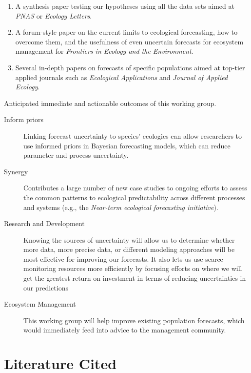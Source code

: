 \documentclass[12pt,]{article}
\providecommand{\tightlist}{%
  \setlength{\itemsep}{0pt}\setlength{\parskip}{0pt}}
\begin{document}
\begin{enumerate}
\def\labelenumi{\arabic{enumi}.}
\tightlist
\item
  A synthesis paper testing our hypotheses using all the data sets aimed
  at \emph{PNAS} or \emph{Ecology Letters}.
\item
  A forum-style paper on the current limits to ecological forecasting,
  how to overcome them, and the usefulness of even uncertain forecasts
  for ecosystem management for \emph{Frontiers in Ecology and the
  Environment}.
\item
  Several in-depth papers on forecasts of specific populations aimed at
  top-tier applied journals such as \emph{Ecological Applications} and
  \emph{Journal of Applied Ecology}.
\end{enumerate}

\begin{Box}[!b]
  \renewcommand{\arraystretch}{1.04}
  \caption{Anticipated immediate and actionable outcomes of this working group.}
  \footnotesize
  \begin{description}
  \item[Inform priors] Linking forecast uncertainty to species' ecologies can allow researchers to use informed priors in Bayesian forecasting models, which can reduce parameter and process uncertainty.
  \item[Synergy] Contributes a large number of new case studies to ongoing efforts to assess the common patterns to ecological predictability across different processes and systems (e.g., the \emph{Near-term ecological forecasting initiative}).
  \item[Research and Development] Knowing the sources of uncertainty will allow us to determine whether more data, more precise data, or different modeling approaches will be most effective for improving our forecasts. It also lets us use scarce monitoring resources more efficiently by focusing efforts on where we will get the greatest return on investment in terms of reducing uncertainties in our predictions
  \item[Ecosystem Management] This working group will help improve existing population forecasts, which would immediately feed into advice to the management community.
  \end{description} 

  \renewcommand{\arraystretch}{1.0}
\end{Box}

\section*{Literature Cited}\label{literature-cited}
\end{document}
